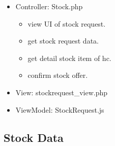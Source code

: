 \documentclass[letterpaper,10pt,english,openany,oneside]{sphinxmanual}
\begin{document}
\begin{itemize}
\item {} 
\sphinxAtStartPar
Controller: Stock.php
\begin{itemize}
\item {} 
\sphinxAtStartPar
{} view UI of stock request.

\item {} 
\sphinxAtStartPar
{} get stock request data.

\item {} 
\sphinxAtStartPar
{} get detail stock item of hc.

\item {} 
\sphinxAtStartPar
{} confirm stock offer.

\end{itemize}

\item {} 
\sphinxAtStartPar
View: stockrequest\_view.php

\item {} 
\sphinxAtStartPar
ViewModel: StockRequest.js

\end{itemize}


\subsection{Stock Data}
\label{\detokenize{module/module:stock-data}}
\end{document}

